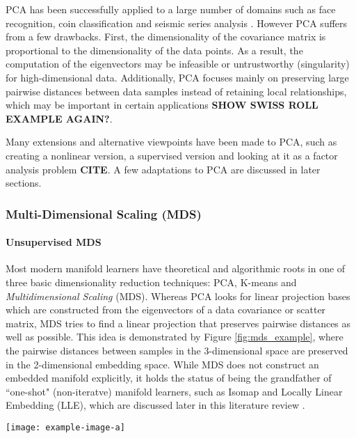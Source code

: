 PCA has been successfully applied to a large  number of domains such as face recognition, coin classification and seismic series analysis \citep{VanDerMaaten2009DRReview}. However PCA suffers from a few drawbacks.  First, the dimensionality of the covariance matrix is proportional to the dimensionality of the data points.  As a result, the computation of the eigenvectors may be infeasible or untrustworthy (singularity) for high-dimensional data.  Additionally, PCA focuses mainly on preserving large pairwise distances between data samples instead of retaining local relationships, which may be important in certain applications \textbf{SHOW SWISS ROLL EXAMPLE AGAIN?}.

Many extensions and alternative viewpoints have been made to PCA, such as creating a nonlinear version, a supervised version and looking at it as a factor analysis problem \textbf{CITE}.  A few adaptations to PCA are discussed in later sections.




\subsubsection{Multi-Dimensional Scaling (MDS)} 

\paragraph{Unsupervised MDS} \label{sec:MDS}
Most modern manifold learners have theoretical and algorithmic roots in one of three basic dimensionality reduction techniques: PCA, K-means and \textit{Multidimensional Scaling} (MDS). Whereas PCA looks for linear projection bases which are constructed from the eigenvectors of a data covariance or scatter matrix, MDS tries to find a linear projection that preserves pairwise distances as well as possible. This idea is demonstrated by Figure \ref{fig:mds_example}, where the pairwise distances between samples in the 3-dimensional space are preserved in the 2-dimensional embedding space. While MDS does not construct an embedded manifold explicitly, it holds the status of being the grandfather of ``one-shot" (non-iteratve) manifold learners, such as Isomap and Locally Linear Embedding (LLE), which are discussed later in this literature review \citep{Kegl2008PrincipalManifoldsTextbook}. 
\begin{center}
	\begin{figure*}[h]
		\centering
		\texttt{[image: example-image-a]}
		\caption[Example of MDS distance preservation.]{Example of MDS distance preservation.}
		\label{fig:mds_example}
	\end{figure*}
\end{center}

